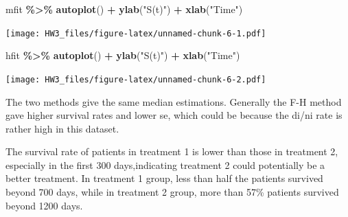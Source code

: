 \documentclass[
]{article}
\newenvironment{Shaded}{\begin{snugshade}}{\end{snugshade}}
\newcommand{\FunctionTok}[1]{\textcolor[rgb]{0.13,0.29,0.53}{\textbf{#1}}}
\newcommand{\NormalTok}[1]{#1}
\newcommand{\SpecialCharTok}[1]{\textcolor[rgb]{0.81,0.36,0.00}{\textbf{#1}}}
\newcommand{\StringTok}[1]{\textcolor[rgb]{0.31,0.60,0.02}{#1}}
\begin{document}
\begin{Shaded}
\begin{Highlighting}[]
\NormalTok{mfit }\SpecialCharTok{\%\textgreater{}\%} \FunctionTok{autoplot}\NormalTok{() }\SpecialCharTok{+} \FunctionTok{ylab}\NormalTok{(}\StringTok{"S(t)"}\NormalTok{) }\SpecialCharTok{+} \FunctionTok{xlab}\NormalTok{(}\StringTok{"Time"}\NormalTok{)}
\end{Highlighting}
\end{Shaded}

\texttt{[image: HW3\_files/figure-latex/unnamed-chunk-6-1.pdf]}

\begin{Shaded}
\begin{Highlighting}[]
\NormalTok{hfit }\SpecialCharTok{\%\textgreater{}\%} \FunctionTok{autoplot}\NormalTok{() }\SpecialCharTok{+} \FunctionTok{ylab}\NormalTok{(}\StringTok{"S(t)"}\NormalTok{) }\SpecialCharTok{+} \FunctionTok{xlab}\NormalTok{(}\StringTok{"Time"}\NormalTok{)}
\end{Highlighting}
\end{Shaded}

\texttt{[image: HW3\_files/figure-latex/unnamed-chunk-6-2.pdf]}

The two methods give the same median estimations. Generally the F-H
method gave higher survival rates and lower se, which could be because
the di/ni rate is rather high in this dataset.

The survival rate of patients in treatment 1 is lower than those in
treatment 2, especially in the first 300 days,indicating treatment 2
could potentially be a better treatment. In treatment 1 group, less than
half the patients survived beyond 700 days, while in treatment 2 group,
more than 57\% patients survived beyond 1200 days.
\end{document}
